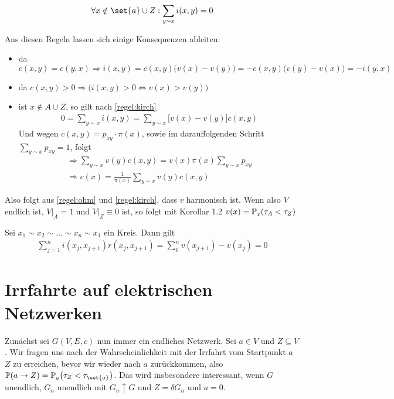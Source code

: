 \begin{regel}
	\label{regel:kirch}
	\begin{align}
		\forall x \notin \set{a} \cup Z: \sum\limits_{y \sim x} i(x,y) = 0
	\end{align}
\end{regel}

Aus diesen Regeln lassen sich einige Konsequenzen ableiten:
\begin{itemize}
	\item da $c(x,y) = c(y,x) \Rightarrow i(x,y) = c(x,y)\big(v(x) -v(y)\big) = -c(x,y)\big(v(y)- v(x)\big) = - i(y,x)$
	\item da $c(x,y) > 0 \Rightarrow \Big({i(x,y) > 0 \Leftrightarrow v(x) > v(y)}\Big)$
	\item ist $x \notin A \cup Z$, so gilt nach \ref{regel:kirch} 
		\begin{align}
			0 = \sum\limits_{y \sim x} i(x,y) = \sum\limits_{y \sim x} \big[v(x)-v(y)\big]c(x,y)
		\end{align}
		Und wegen $c(x,y) = p_{xy} \cdot \pi(x)$, sowie im darauffolgenden Schritt $\sum\limits_{y \sim x} p_{xy} = 1$, folgt
		\begin{align}
			\Rightarrow \sum\limits_{y\sim x} v(y)c(x,y) = v(x)\pi(x) \sum\limits_{y \sim x} p_{xy} \\
			\Rightarrow v(x) = \frac{1}{\pi(x)} \sum\limits_{y \sim x} v(y) c(x,y)
		\end{align}
\end{itemize}
Also folgt aus \ref{regel:ohm} und \ref{regel:kirch}, dass $v$ harmonisch ist. Wenn also $V$ endlich ist, $V|_A = 1$ und $V|_Z \equiv 0$ ist, so folgt mit Korollar 1.2  $v(x) = \prop{\tau_A < \tau_Z}[][x]$

\begin{korollar}
	Sei $x_1 \sim x_2 \sim \dots \sim x_n \sim x_1$ ein Kreis. Dann gilt 
	\begin{align}
		\sum\limits_{j=1}^{n}i(x_j,x_{j+1})r(x_j,x_{j+1}) = \sum\limits_{0}^{n}v(x_{j+1}) - v(x_j) = 0
	\end{align}
\end{korollar}

\section{Irrfahrte auf elektrischen Netzwerken}
Zunächst sei $G(V,E,c)$ nun immer ein endliches Netzwerk. Sei $a \in V$ und $Z \subseteq V$. Wir fragen uns nach der Wahrscheinlichkeit mit der Irrfahrt vom Startpunkt $a$ $Z$ zu erreichen, bevor wir wieder nach $a$ zurückkommen, also $\prop{a \to Z} = \prop{\tau_Z < \tau_{\set{a}}}[][a]$. Das wird insbesondere interessant, wenn $G$ unendlich, $G_n$ unendlich mit $G_n \uparrow G$ und  $Z = \delta G_n$ und $a=0$.

